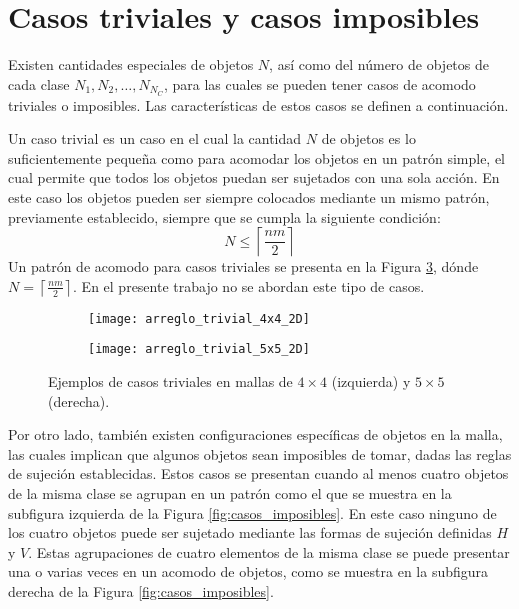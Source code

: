 \section{Casos triviales y casos imposibles}
\label{sec:casos_triviales_e_imposibles}
%
%
Existen cantidades especiales de objetos $N$, así como del número de objetos de cada clase $N_1, N_2, \ldots, N_{N_C}$, para las cuales se pueden tener casos de acomodo triviales o imposibles.
Las características de estos casos se definen a continuación.

Un caso trivial es un caso en el cual la cantidad $N$ de objetos es lo suficientemente pequeña como para acomodar los objetos en un patrón simple, el cual permite que todos los objetos puedan ser sujetados con una sola acción.
En este caso los objetos pueden ser siempre colocados mediante un mismo patrón, previamente establecido, siempre que se cumpla la siguiente condición:
%
\begin{equation}
	\label{eq:condicion_triviales}
	N \leq \left\lceil \frac{nm}{2} \right\rceil
\end{equation}
%
Un patrón de acomodo para casos triviales se presenta en la Figura \ref{fig:casos_triviales}, dónde $N = \left\lceil \frac{nm}{2} \right\rceil$.
En el presente trabajo no se abordan este tipo de casos.
%
\begin{figure}[H]
    \begin{subfigure}{0.3\textwidth}
		\texttt{[image: arreglo\_trivial\_4x4\_2D]}%
       	\label{subfig:trivial_4x4}%
    \end{subfigure}%
    \hspace{2.2cm}
    \begin{subfigure}{0.3\textwidth}
       	\texttt{[image: arreglo\_trivial\_5x5\_2D]}%
       	\label{subfig:trivial_5x5}%
    \end{subfigure}%
    \caption{Ejemplos de casos triviales en mallas de $4\times 4$ (izquierda) y $5\times 5$ (derecha).}
    \label{fig:casos_triviales}%
\end{figure}
%
Por otro lado, también existen configuraciones específicas de objetos en la malla, las cuales implican que algunos objetos sean imposibles de tomar, dadas las reglas de sujeción establecidas.
Estos casos se presentan cuando al menos cuatro objetos de la misma clase se agrupan en un patrón como el que se muestra en la subfigura izquierda de la Figura \ref{fig:casos_imposibles}.
En este caso ninguno de los cuatro objetos puede ser sujetado mediante las formas de sujeción definidas $H$ y $V$.
Estas agrupaciones de cuatro elementos de la misma clase se puede presentar una o varias veces en un acomodo de objetos, como se muestra en la subfigura derecha de la Figura \ref{fig:casos_imposibles}.

